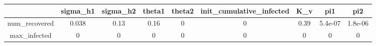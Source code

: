 \begin{tabular}{|c|c|c|c|c|c|c|c|c|}
\hline
& sigma_h1 & sigma_h2 & theta1 & theta2 & init_cumulative_infected & K_v & pi1 & pi2 \\
\hline
num_recovered & 0.038 & 0.13 & 0.16 & 0 & 0 & 0.39 & 5.4e-07 & 1.8e-06 \\
\hline
max_infected & 0 & 0 & 0 & 0 & 0 & 0 & 0 & 0 \\
\hline
\end{tabular}

